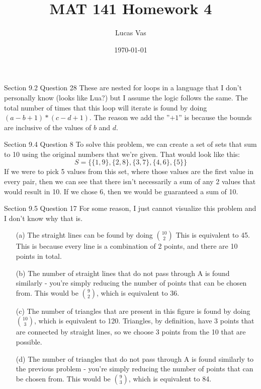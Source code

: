 \documentclass[12pt]{article}
\title{MAT 141 Homework 4}
\author{Lucas Vas}
\date{\today}
\begin{document}
  \maketitle

  \begin{problem}{Section 9.2 Question 28}
    These are nested for loops in a language that I don't personally know (looks like Lua?)
    but I assume the logic follows the same. The total number of times that this loop will
    iterate is found by doing $(a-b+1) * (c-d+1)$. The reason we add the ''$+1$'' is because
    the bounds are inclusive of the values of $b$ and $d$.
  \end{problem}

  \begin{problem}{Section 9.4 Question 8}
    To solve this problem, we can create a set of sets that sum to 10 using the original
    numbers that we're given. That would look like this:
    \[S = \{ \{1, 9\}, \{2, 8\}, \{3, 7\}, \{4, 6\}, \{5\} \} \]
    If we were to pick 5 values from this set, where those values are the first value in 
    every pair, then we can see that there isn't necessarily a sum of any 2 values that
    would result in 10. If we chose 6, then we would be guaranteed a sum of 10.
  \end{problem}

  \begin{problem}{Section 9.5 Question 17}
    For some reason, I just cannot visualize this problem and I don't know why that is.
    \begin{itemize}
      \item[(a)] The straight lines can be found by doing $\binom{10}{2}$ This is equivalent to
        45. This is because every line is a combination of 2 points, and there are 10 points in
        total.
      \item[(b)] The number of straight lines that do not pass through A is found similarly -
        you're simply reducing the number of points that can be chosen from. This would be
        $\binom{9}{2}$, which is equivalent to 36.
      \item[(c)] The number of triangles that are present in this figure is found by doing
        $\binom{10}{3}$, which is equivalent to 120. Triangles, by definition, have 3 points
        that are connected by straight lines, so we choose 3 points from the 10 that are
        possible.
      \item[(d)] The number of triangles that do not pass through A is found similarly to the
        previous problem - you're simply reducing the number of points that can be chosen from.
        This would be $\binom{9}{3}$, which is equivalent to 84.
    \end{itemize}
  \end{problem}
  
\end{document}
